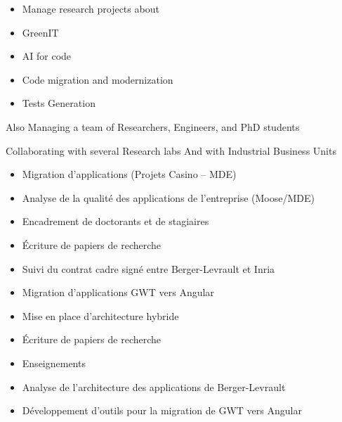 \documentclass[10pt,a4paper,ragged2e,withhyper]{altacv}
\begin{document}
\begin{paracol}{2}



\begin{itemize}
\item Manage research projects about 
\item GreenIT 
\item AI for code
\item Code migration and modernization 
\item Tests Generation
\end{itemize}

Also Managing a team of Researchers, Engineers, and PhD students

Collaborating with several Research labs And with Industrial Business Units

\divider

\begin{itemize}
  \item Migration d'applications (Projets Casino -- MDE)
  \item Analyse de la qualité des applications de l'entreprise (Moose/MDE)
  \item Encadrement de doctorants et de stagiaires
  \item Écriture de papiers de recherche
  \item Suivi du contrat cadre signé entre Berger-Levrault et Inria
\end{itemize}

\divider

\begin{itemize}
  \item Migration d'applications GWT vers Angular
  \item Mise en place d'architecture hybride
  \item Écriture de papiers de recherche
  \item Enseignements
\end{itemize}

\divider

\begin{itemize}
  \item Analyse de l’architecture des applications de Berger-Levrault
  \item Développement d'outils pour la migration de GWT vers Angular
\end{itemize}


\end{paracol}
\end{document}
